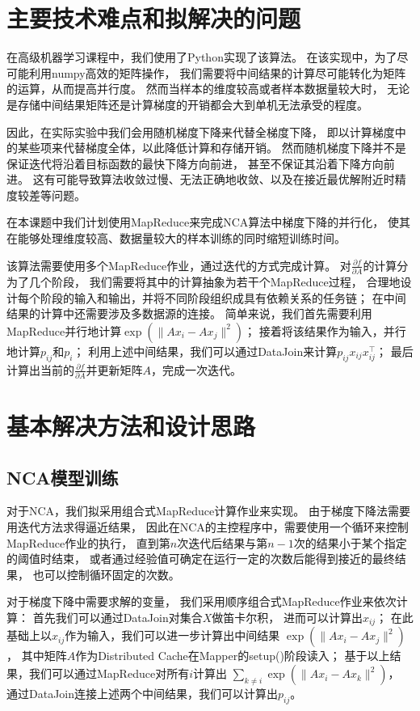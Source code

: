 \documentclass[a4paper,UTF8]{article}
\theoremstyle{definition}
\begin{document}
\section*{主要技术难点和拟解决的问题}

在高级机器学习课程中，我们使用了Python实现了该算法。
在该实现中，为了尽可能利用numpy高效的矩阵操作，
我们需要将中间结果的计算尽可能转化为矩阵的运算，从而提高并行度。
然而当样本的维度较高或者样本数据量较大时，
无论是存储中间结果矩阵还是计算梯度的开销都会大到单机无法承受的程度。

因此，在实际实验中我们会用随机梯度下降来代替全梯度下降，
即以计算梯度中的某些项来代替梯度全体，以此降低计算和存储开销。
然而随机梯度下降并不是保证迭代将沿着目标函数的最快下降方向前进，
甚至不保证其沿着下降方向前进。
这有可能导致算法收敛过慢、无法正确地收敛、以及在接近最优解附近时精度较差等问题。

在本课题中我们计划使用MapReduce来完成NCA算法中梯度下降的并行化，
使其在能够处理维度较高、数据量较大的样本训练的同时缩短训练时间。

该算法需要使用多个MapReduce作业，通过迭代的方式完成计算。
对$\frac{\partial f}{\partial A}$的计算分为了几个阶段，
我们需要将其中的计算抽象为若干个MapReduce过程，
合理地设计每个阶段的输入和输出，并将不同阶段组织成具有依赖关系的任务链；
在中间结果的计算中还需要涉及多数据源的连接。
简单来说，我们首先需要利用MapReduce并行地计算$\exp(\lVert Ax_{i} - Ax_{j} \rVert^2)$；
接着将该结果作为输入，并行地计算$p_{ij}$和$p_{i}$；
利用上述中间结果，我们可以通过DataJoin来计算$p_{ij} x_{ij} x_{ij}^\top$；
最后计算出当前的$\frac{\partial f}{\partial A}$并更新矩阵$A$，完成一次迭代。

\section*{基本解决方法和设计思路}

\subsection*{NCA模型训练}

对于NCA，我们拟采用组合式MapReduce计算作业来实现。
由于梯度下降法需要用迭代方法求得逼近结果，
因此在NCA的主控程序中，需要使用一个循环来控制MapReduce作业的执行，
直到第$n$次迭代后结果与第$n-1$次的结果小于某个指定的阈值时结束，
或者通过经验值可确定在运行一定的次数后能得到接近的最终结果，
也可以控制循环固定的次数。

对于梯度下降中需要求解的变量，
我们采用顺序组合式MapReduce作业来依次计算：
首先我们可以通过DataJoin对集合$X$做笛卡尔积，
进而可以计算出$x_{ij}$；
在此基础上以$x_{ij}$作为输入，我们可以进一步计算出中间结果
$\exp(\lVert Ax_{i} - Ax_{j} \rVert^2)$，
其中矩阵$A$作为Distributed Cache在Mapper的setup()阶段读入；
基于以上结果，我们可以通过MapReduce对所有$i$计算出
$\sum_{k \neq i} \exp(\lVert Ax_{i} - Ax_{k} \rVert^2)$，
通过DataJoin连接上述两个中间结果，我们可以计算出$p_{ij}$。
\end{document}
